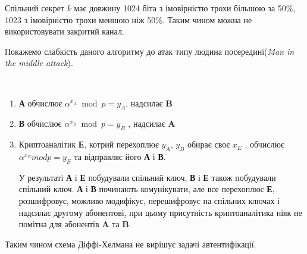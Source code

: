 Спільний секрет $k$ має довжину 1024 біта з імовірністю трохи більшою за 50\%, 1023 з імовірністю трохи меншою ніж 50\%.
Таким чином можна не використовувати закритий канал.

Покажемо слабкість даного алгоритму до атак типу людина посередині(\textit{Man in the middle attack}).

\begin{algorithm}\
\begin{enumerate}
\item \textbf{А} обчислює $\alpha ^{x_A} \bmod p = y_A $, надсилає \textbf{B} 

\item \textbf{В} обчислює $\alpha ^{x_B} \bmod p = y_B $ , надсилає \textbf{A}

\item Криптоаналітик \textbf{Е}, котрий перехоплює $y_A$, $y_B$ обирає своє $x_E$ , обчислює $\alpha ^{x_E} mod p = y_E $ та відправляє його \textbf{А} і \textbf{В}.

У результаті \textbf{А} і \textbf{Е} побудували спільний ключ, \textbf{В} і \textbf{Е} також побудували спільний ключ. 
\textbf{А} і \textbf{В} починають комунікувати, але все перехоплює \textbf{Е}, розшифровує, можливо модифікує, перешифровує на спільних ключах і надсилає другому абонентові, при цьому присутність криптоаналітика ніяк не помітна для абонентів \textbf{A} та \textbf{B}.
\end{enumerate}

\end{algorithm}
Таким чином схема Діффі-Хелмана не вирішує задачі автентифікації.